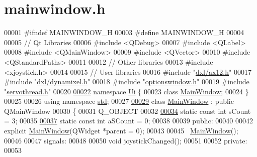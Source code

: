 \hypertarget{mainwindow_8h_source}{}\section{mainwindow.\+h}

\begin{DoxyCode}
00001 \textcolor{preprocessor}{#ifndef MAINWINDOW\_H}
00003 \textcolor{preprocessor}{#define MAINWINDOW\_H}
00004 
00005 \textcolor{comment}{// Qt Libraries}
00006 \textcolor{preprocessor}{#include <QDebug>}
00007 \textcolor{preprocessor}{#include <QLabel>}
00008 \textcolor{preprocessor}{#include <QMainWindow>}
00009 \textcolor{preprocessor}{#include <QVector>}
00010 \textcolor{preprocessor}{#include <QStandardPaths>}
00011 
00012 \textcolor{comment}{// Other libraries}
00013 \textcolor{preprocessor}{#include <xjoystick.h>}
00014 
00015 \textcolor{comment}{// User libraries}
00016 \textcolor{preprocessor}{#include "\hyperlink{ax12_8h}{dxl/ax12.h}"}
00017 \textcolor{preprocessor}{#include "\hyperlink{dynamixel_8h}{dxl/dynamixel.h}"}
00018 \textcolor{preprocessor}{#include "\hyperlink{optionswindow_8h}{optionswindow.h}"}
00019 \textcolor{preprocessor}{#include "\hyperlink{servothread_8h}{servothread.h}"}
00020 
\hypertarget{mainwindow_8h_source_l00022}{}\hyperlink{namespace_ui}{00022} \textcolor{keyword}{namespace }\hyperlink{namespace_ui}{Ui} \{
00023 \textcolor{keyword}{class }\hyperlink{class_main_window}{MainWindow};
00024 \}
00025 
00026 \textcolor{keyword}{using namespace }\hyperlink{namespacestd}{std};
00027 
\hypertarget{mainwindow_8h_source_l00029}{}\hyperlink{class_main_window}{00029} \textcolor{keyword}{class }\hyperlink{class_main_window}{MainWindow} : \textcolor{keyword}{public} QMainWindow
00030 \{
00031     Q\_OBJECT
00032     
\hypertarget{mainwindow_8h_source_l00034}{}\hyperlink{class_main_window_a646727b1c45c72638325adfd460649c0}{00034}     \textcolor{keyword}{static} \textcolor{keyword}{const} \textcolor{keywordtype}{int} sCount = 3;
00035     
\hypertarget{mainwindow_8h_source_l00037}{}\hyperlink{class_main_window_a42c44af9c0eebc33f4e81f02e15b0461}{00037}     \textcolor{keyword}{static} \textcolor{keyword}{const} \textcolor{keywordtype}{int} aSCount = 0;
00038     
00039 \textcolor{keyword}{public}:
00040     
00042     \textcolor{keyword}{explicit} \hyperlink{class_main_window}{MainWindow}(QWidget *parent = 0);
00043     
00045     ~\hyperlink{class_main_window}{MainWindow}();
00046     
00047 signals:
00048     
00050     \textcolor{keywordtype}{void} joystickChanged();
00051 
00052 \textcolor{keyword}{private}:  
00053     

\end{DoxyCode}
